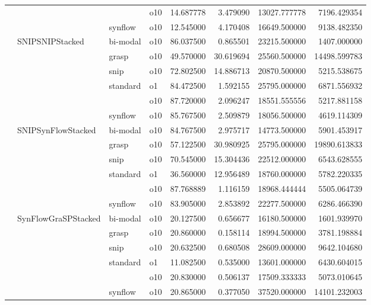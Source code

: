 \begin{longtable}{llllrrrr}
      &     &         & o10 &  14.687778 &   3.479090 &     13027.777778 &   7196.429354 \\
      &     & synflow & o10 &  12.545000 &   4.170408 &     16649.500000 &   9138.482350 \\
      & SNIPSNIPStacked & bi-modal & o10 &  86.037500 &   0.865501 &     23215.500000 &   1407.000000 \\
      &     & grasp & o10 &  49.570000 &  30.619694 &     25560.500000 &  14498.599783 \\
      &     & snip & o10 &  72.802500 &  14.886713 &     20870.500000 &   5215.538675 \\
      &     & standard & o1 &  84.472500 &   1.592155 &     25795.000000 &   6871.556932 \\
      &     &         & o10 &  87.720000 &   2.096247 &     18551.555556 &   5217.881158 \\
      &     & synflow & o10 &  85.767500 &   2.509879 &     18056.500000 &   4619.114309 \\
      & SNIPSynFlowStacked & bi-modal & o10 &  84.767500 &   2.975717 &     14773.500000 &   5901.453917 \\
      &     & grasp & o10 &  57.122500 &  30.980925 &     25795.000000 &  19890.613833 \\
      &     & snip & o10 &  70.545000 &  15.304436 &     22512.000000 &   6543.628555 \\
      &     & standard & o1 &  36.560000 &  12.956489 &     18760.000000 &   5782.220335 \\
      &     &         & o10 &  87.768889 &   1.116159 &     18968.444444 &   5505.064739 \\
      &     & synflow & o10 &  83.905000 &   2.853892 &     22277.500000 &   6286.466390 \\
      & SynFlowGraSPStacked & bi-modal & o10 &  20.127500 &   0.656677 &     16180.500000 &   1601.939970 \\
      &     & grasp & o10 &  20.860000 &   0.158114 &     18994.500000 &   3781.198884 \\
      &     & snip & o10 &  20.632500 &   0.680508 &     28609.000000 &   9642.104680 \\
      &     & standard & o1 &  11.082500 &   0.535000 &     13601.000000 &   6430.604015 \\
      &     &         & o10 &  20.830000 &   0.506137 &     17509.333333 &   5073.010645 \\
      &     & synflow & o10 &  20.865000 &   0.377050 &     37520.000000 &  14101.232003 \\

\end{longtable}
